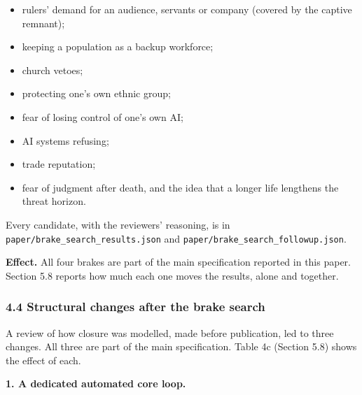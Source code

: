 \documentclass[
  10pt,
]{article}
\providecommand{\tightlist}{%
  \setlength{\itemsep}{0pt}\setlength{\parskip}{0pt}}
\begin{document}
\begin{itemize}
\tightlist
\item
  rulers' demand for an audience, servants or company (covered by the captive remnant);
\item
  keeping a population as a backup workforce;
\item
  church vetoes;
\item
  protecting one's own ethnic group;
\item
  fear of losing control of one's own AI;
\item
  AI systems refusing;
\item
  trade reputation;
\item
  fear of judgment after death, and the idea that a longer life lengthens the threat horizon.
\end{itemize}

Every candidate, with the reviewers' reasoning, is in \texttt{paper/brake\_search\_results.json} and
\texttt{paper/brake\_search\_followup.json}.

\textbf{Effect.} All four brakes are part of the main specification reported in this paper. Section
5.8 reports how much each one moves the results, alone and together.

\subsubsection{4.4 Structural changes after the brake
search}\label{structural-changes-after-the-brake-search}

A review of how closure was modelled, made before publication, led to three changes. All three are
part of the main specification. Table 4c (Section 5.8) shows the effect of each.

\textbf{1. A dedicated automated core loop.}
\end{document}
